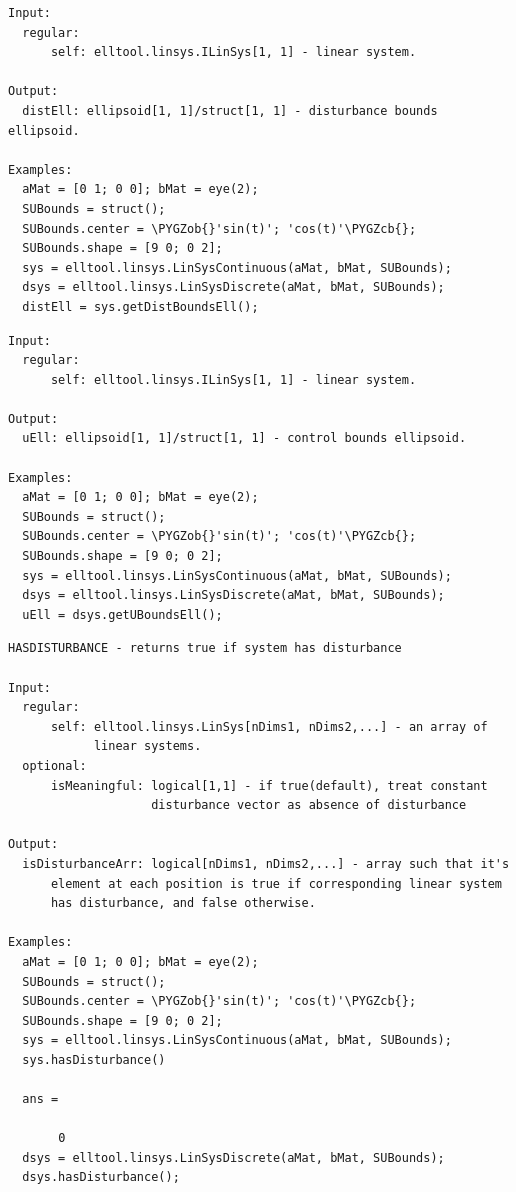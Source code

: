 \documentclass[letterpaper,10pt,english]{sphinxmanual}
\def\PYGZob{\char`\{}
\def\PYGZcb{\char`\}}
\begin{document}
\begin{Verbatim}[commandchars=\\\{\}]
Input:
  regular:
      self: elltool.linsys.ILinSys[1, 1] - linear system.

Output:
  distEll: ellipsoid[1, 1]/struct[1, 1] - disturbance bounds ellipsoid.

Examples:
  aMat = [0 1; 0 0]; bMat = eye(2);
  SUBounds = struct();
  SUBounds.center = \PYGZob{}'sin(t)'; 'cos(t)'\PYGZcb{};
  SUBounds.shape = [9 0; 0 2];
  sys = elltool.linsys.LinSysContinuous(aMat, bMat, SUBounds);
  dsys = elltool.linsys.LinSysDiscrete(aMat, bMat, SUBounds);
  distEll = sys.getDistBoundsEll();
\end{Verbatim}

\begin{Verbatim}[commandchars=\\\{\}]
Input:
  regular:
      self: elltool.linsys.ILinSys[1, 1] - linear system.

Output:
  uEll: ellipsoid[1, 1]/struct[1, 1] - control bounds ellipsoid.

Examples:
  aMat = [0 1; 0 0]; bMat = eye(2);
  SUBounds = struct();
  SUBounds.center = \PYGZob{}'sin(t)'; 'cos(t)'\PYGZcb{};
  SUBounds.shape = [9 0; 0 2];
  sys = elltool.linsys.LinSysContinuous(aMat, bMat, SUBounds);
  dsys = elltool.linsys.LinSysDiscrete(aMat, bMat, SUBounds);
  uEll = dsys.getUBoundsEll();
\end{Verbatim}

\begin{Verbatim}[commandchars=\\\{\}]
HASDISTURBANCE - returns true if system has disturbance

Input:
  regular:
      self: elltool.linsys.LinSys[nDims1, nDims2,...] - an array of
            linear systems.
  optional:
      isMeaningful: logical[1,1] - if true(default), treat constant
                    disturbance vector as absence of disturbance

Output:
  isDisturbanceArr: logical[nDims1, nDims2,...] - array such that it's
      element at each position is true if corresponding linear system
      has disturbance, and false otherwise.

Examples:
  aMat = [0 1; 0 0]; bMat = eye(2);
  SUBounds = struct();
  SUBounds.center = \PYGZob{}'sin(t)'; 'cos(t)'\PYGZcb{};
  SUBounds.shape = [9 0; 0 2];
  sys = elltool.linsys.LinSysContinuous(aMat, bMat, SUBounds);
  sys.hasDisturbance()

  ans =

       0
  dsys = elltool.linsys.LinSysDiscrete(aMat, bMat, SUBounds);
  dsys.hasDisturbance();
\end{Verbatim}
\end{document}
